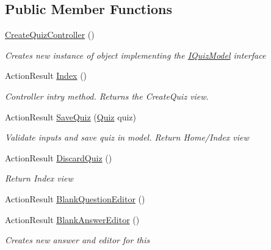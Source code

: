 \subsection*{Public Member Functions}
\begin{DoxyCompactItemize}
\item 
\hyperlink{class_website_1_1_controllers_1_1_create_quiz_controller_ab90700b03df495b8feac4007988ef32f}{Create\+Quiz\+Controller} ()
\begin{DoxyCompactList}\small\item\em Creates new instance of object implementing the \hyperlink{interface_website_1_1_controllers_1_1_i_quiz_model}{I\+Quiz\+Model} interface \end{DoxyCompactList}\item 
Action\+Result \hyperlink{class_website_1_1_controllers_1_1_create_quiz_controller_a068c6ffe4fbe169bf721c7eb6103b84d}{Index} ()
\begin{DoxyCompactList}\small\item\em Controller intry method. Returns the Create\+Quiz view. \end{DoxyCompactList}\item 
Action\+Result \hyperlink{class_website_1_1_controllers_1_1_create_quiz_controller_afa6a0dd88532f1590d1514889d81538e}{Save\+Quiz} (\hyperlink{class_website_1_1_models_1_1_quiz}{Quiz} quiz)
\begin{DoxyCompactList}\small\item\em Validate inputs and save quiz in model. Return Home/\+Index view \end{DoxyCompactList}\item 
Action\+Result \hyperlink{class_website_1_1_controllers_1_1_create_quiz_controller_a53fc25a2a1f5ab3b7b0e37d14191c3d8}{Discard\+Quiz} ()
\begin{DoxyCompactList}\small\item\em Return Index view \end{DoxyCompactList}\item 
Action\+Result \hyperlink{class_website_1_1_controllers_1_1_create_quiz_controller_a566fb35bcd9cd4ed56000b91e67229fc}{Blank\+Question\+Editor} ()
\item 
Action\+Result \hyperlink{class_website_1_1_controllers_1_1_create_quiz_controller_a8ee63fb5f50a07be75c1208e01eb095c}{Blank\+Answer\+Editor} ()
\begin{DoxyCompactList}\small\item\em Creates new answer and editor for this \end{DoxyCompactList}\end{DoxyCompactItemize}

